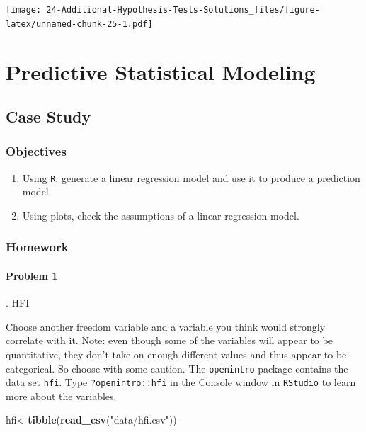 \documentclass[
]{book}
\newenvironment{Shaded}{\begin{snugshade}}{\end{snugshade}}
\newcommand{\KeywordTok}[1]{\textcolor[rgb]{0.13,0.29,0.53}{\textbf{#1}}}
\newcommand{\NormalTok}[1]{#1}
\newcommand{\StringTok}[1]{\textcolor[rgb]{0.31,0.60,0.02}{#1}}
\providecommand{\tightlist}{%
  \setlength{\itemsep}{0pt}\setlength{\parskip}{0pt}}
\begin{document}
\texttt{[image: 24-Additional-Hypothesis-Tests-Solutions\_files/figure-latex/unnamed-chunk-25-1.pdf]}

\hypertarget{part-predictive-statistical-modeling}{%
\part{Predictive Statistical Modeling}\label{part-predictive-statistical-modeling}}

\hypertarget{CS4}{%
\chapter{Case Study}\label{CS4}}

\hypertarget{objectives-23}{%
\section{Objectives}\label{objectives-23}}

\begin{enumerate}
\def\labelenumi{\arabic{enumi})}
\tightlist
\item
  Using \texttt{R}, generate a linear regression model and use it to produce a prediction model.\\
\item
  Using plots, check the assumptions of a linear regression model.
\end{enumerate}

\hypertarget{homework-24}{%
\section{Homework}\label{homework-24}}

\hypertarget{problem-1-24}{%
\subsection{Problem 1}\label{problem-1-24}}

. HFI

Choose another freedom variable and a variable you think would strongly correlate with it. Note: even though some of the variables will appear to be quantitative, they don't take on enough different values and thus appear to be categorical. So choose with some caution. The \texttt{openintro} package contains the data set \texttt{hfi}. Type \texttt{?openintro::hfi} in the Console window in \texttt{RStudio} to learn more about the variables.

\begin{Shaded}
\begin{Highlighting}[]
\NormalTok{hfi<-}\KeywordTok{tibble}\NormalTok{(}\KeywordTok{read_csv}\NormalTok{(}\StringTok{"data/hfi.csv"}\NormalTok{))}
\end{Highlighting}
\end{Shaded}
\end{document}
